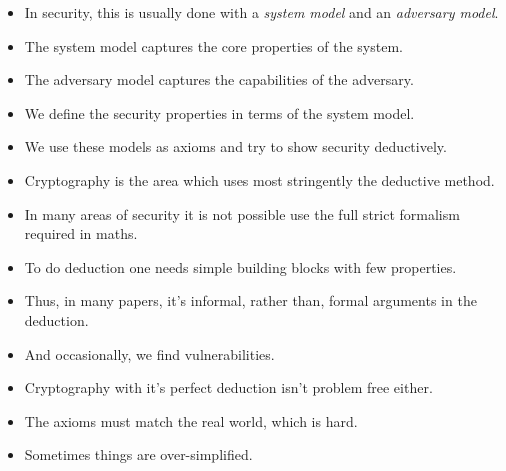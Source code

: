 \begin{frame}
  \begin{itemize}
    \item In security, this is usually done with a \emph{system model} and an 
      \emph{adversary model}.
  \end{itemize}

  \pause

  \begin{definition}
    \begin{itemize}
      \item The system model captures the core properties of the system.
      \item The adversary model captures the capabilities of the adversary.
    \end{itemize}
  \end{definition}

  \pause

  \begin{itemize}
    \item We define the security properties in terms of the system model.
    \item We use these models as axioms and try to show security deductively.
  \end{itemize}
\end{frame}

\begin{frame}
  \begin{remark}
    \begin{itemize}
      \item Cryptography is the area which uses most stringently the deductive 
        method.
      \item In many areas of security it is not possible use the full strict 
        formalism required in maths.
      \item To do deduction one needs simple building blocks with few 
        properties.
      \item Thus, in many papers, it's informal, rather than, formal arguments 
        in the deduction.
      \item And occasionally, we find vulnerabilities.
    \end{itemize}
  \end{remark}
\end{frame}

\begin{frame}
  \begin{remark}
    \begin{itemize}
      \item Cryptography with it's perfect deduction isn't problem free either.
      \item The axioms must match the real world, which is hard.
      \item Sometimes things are over-simplified.
    \end{itemize}
  \end{remark}
\end{frame}

